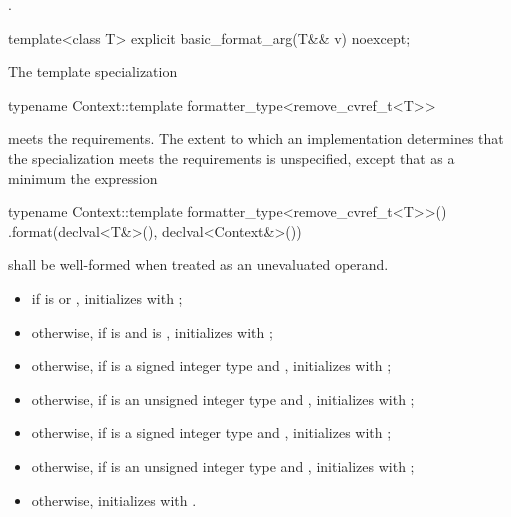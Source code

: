 \begin{itemdescr}
\pnum
\ensures
{}.
\end{itemdescr}

\begin{itemdecl}
template<class T> explicit basic_format_arg(T&& v) noexcept;
\end{itemdecl}

\begin{itemdescr}
\pnum
\constraints
The template specialization
\begin{codeblock}
typename Context::template formatter_type<remove_cvref_t<T>>
\end{codeblock}
meets the  requirements.
The extent to which an implementation determines that
the specialization meets the  requirements
is unspecified,
except that as a minimum the expression
\begin{codeblock}
typename Context::template formatter_type<remove_cvref_t<T>>()
  .format(declval<T&>(), declval<Context&>())
\end{codeblock}
shall be well-formed when treated as an unevaluated operand.

\pnum
\effects
\begin{itemize}
\item
if  is  or ,
initializes  with ;
\item
otherwise, if  is  and  is
, initializes  with
;
\item
otherwise, if  is a signed integer type
and ,
initializes  with ;
\item
otherwise, if  is an unsigned integer type and
, initializes
 with ;
\item
otherwise, if  is a signed integer type and
, initializes
 with ;
\item
otherwise, if  is an unsigned integer type and
, initializes
 with
;
\item
otherwise, initializes  with .
\end{itemize}
\end{itemdescr}

